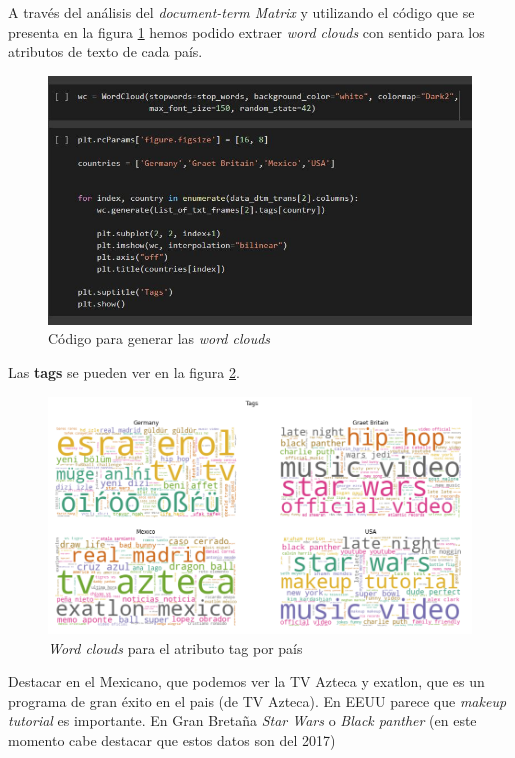 \documentclass[a4paper,12pt]{article}
\begin{document}
A trav\'es del an\'alisis del {\itshape document-term Matrix} y utilizando el c\'odigo que se presenta en la figura \ref{fig:colud_1}  hemos podido extraer {\itshape word clouds} con sentido para los atributos de texto de cada pa\'is.


\begin{figure}[h!]
\centering
\includegraphics[width=13cm]{cod_word.JPG}
\caption{C\'odigo para generar las {\itshape word clouds}}
\label{fig:colud_1}
\end{figure}

Las \textbf{tags} se pueden ver en la figura \ref{fig:colud_2}.


\begin{figure}[h!]
\centering
\includegraphics[width=13cm]{wordcloud_tags.png}

\caption{{\itshape Word clouds} para el atributo tag por pa\'is}
\label{fig:colud_2}
\end{figure}

Destacar en el Mexicano, que podemos ver la TV Azteca y exatlon, que es un programa de gran \'exito en el pais (de TV Azteca). En EEUU parece que {\itshape makeup tutorial} es importante. En Gran Breta\~na {\itshape Star Wars} o {\itshape Black panther} (en este momento cabe destacar que estos datos son del 2017)
\end{document}
